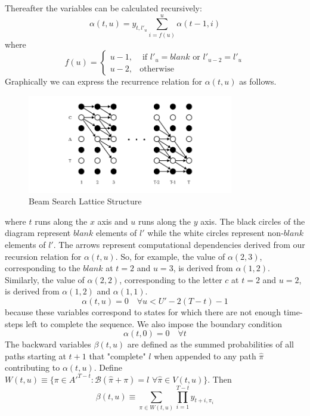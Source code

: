 Thereafter the variables can be calculated recursively:
\begin{equation}
\alpha(t,u) = y_{t, l'_u} \sum_{i = f(u)}^{u} \alpha(t-1, i)
\label{eqn_c3_ctc06}\end{equation}
where
\begin{equation}
f(u) =\begin{cases}u-1, & \text{ if } l'_u = blank \text{ or } l'_{u-2} = l'_{u} \\ u-2, & \text{otherwise}\end{cases}
\label{eqn_c3_ctc07}\end{equation}
Graphically we can express the recurrence relation for $\alpha(t, u)$ as follows.

\begin{figure}
\centering
  \includegraphics[width=9cm]{thesis/images/Lattice.png}
  \caption{Beam Search Lattice Structure \citep{graves2006connectionist}}
\label{fig_3_a_lattice}
\end{figure}

where $t$ runs along the $x$ axis and $u$ runs along the $y$ axis. The black circles of the diagram represent $blank$ elements of $l'$ while the white circles represent non-$blank$ elements of $l'$. The arrows represent computational dependencies derived from our recursion relation for $\alpha(t,u)$. So, for example, the value of $\alpha(2,3)$, corresponding to the $blank$ at $t=2$ and $u=3$, is derived from $\alpha(1,2)$. Similarly, the value of $\alpha(2,2)$, corresponding to the letter $c$ at $t=2$ and $u=2$, is derived from $\alpha(1,2)$ and $\alpha(1,1)$.
\begin{equation}
\alpha(t,u)=0 \quad \forall u < U'-2(T-t)-1
\label{eqn_c3_ctc07}\end{equation}
because these variables correspond to states for which there are not enough time-steps left to complete the sequence. We also impose the boundary condition
\begin{equation}
\alpha(t, 0) = 0 \quad \forall t
\label{eqn_c3_ctc08}
\end{equation}
The backward variables $\beta(t,u)$ are defined as the summed probabilities of all paths starting at $t + 1$ that "complete" $l$ when appended to any path $\hat{\pi}$ contributing to $\alpha(t,u)$. Define $W(t,u) \equiv \{ \pi \in A'^{T-t} : \mathcal{B}(\hat{\pi} + \pi) = l \, \, \forall \hat{\pi} \in V(t,u) \}$. Then
\begin{equation}
\beta(t,u) \equiv \sum_{\pi \in W(t,u)} \prod_{i=1}^{T - t} y_{t + i,\pi_i} \label{eqn_c3_ctc08}\end{equation}

